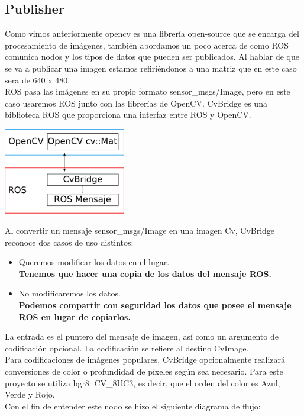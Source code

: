 \subsection{Publisher}
Como vimos anteriormente opencv es una librería open-source que se encarga del procesamiento
de imágenes, también abordamos un poco acerca de como ROS comunica nodos y los
tipos de datos que pueden ser publicados. Al hablar de que se va a publicar una imagen
estamos refiriéndonos a una matriz que en este caso sera de 640 x 480.\\
ROS pasa las imágenes en su propio formato sensor\_msgs/Image, pero
en este caso usaremos ROS junto con las librerías de OpenCV. CvBridge es una
biblioteca ROS que proporciona una interfaz entre ROS y OpenCV.
\begin{center}
	\includegraphics[width=0.4\textwidth]{Contenido/Cuerpo/Capitulo4/Fig1.eps}
	\label{Fig1}
\end{center}
Al convertir un mensaje sensor\_msgs/Image en una imagen Cv, CvBridge
reconoce dos casos de uso distintos:
\begin{itemize}
	\item Queremos modificar los datos en el lugar.\\
	      \textbf{Tenemos que hacer una copia de los datos del mensaje ROS.}
	\item No modificaremos los datos.\\
	      \textbf{Podemos compartir con seguridad los datos que posee el mensaje ROS en lugar de copiarlos.}
\end{itemize}
La entrada es el puntero del mensaje de imagen, así como un argumento de
codificación opcional. La codificación se refiere al destino CvImage.\\
Para codificaciones de imágenes populares, CvBridge opcionalmente realizará
conversiones de color o profundidad de píxeles según sea necesario. Para este proyecto
se utiliza bgr8: CV\_8UC3, es decir, que el orden del color es Azul, Verde y Rojo.\\
Con el fin de entender este nodo se hizo el siguiente diagrama de flujo:
